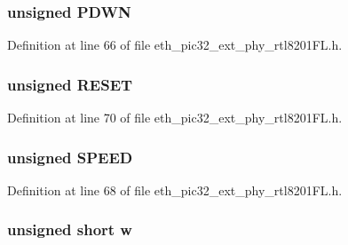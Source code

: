 \subsubsection[{P\+D\+W\+N}]{\setlength{\rightskip}{0pt plus 5cm}unsigned P\+D\+W\+N}\label{union_____b_m_c_o_nbits__t_a1d62ad60d164ae9584ed177c6d49d0c2}


Definition at line 66 of file eth\+\_\+pic32\+\_\+ext\+\_\+phy\+\_\+rtl8201\+F\+L.\+h.

\hypertarget{union_____b_m_c_o_nbits__t_abd544ef72bf6c8e26d48024e20c2ac9b}{}
\subsubsection[{R\+E\+S\+E\+T}]{\setlength{\rightskip}{0pt plus 5cm}unsigned R\+E\+S\+E\+T}\label{union_____b_m_c_o_nbits__t_abd544ef72bf6c8e26d48024e20c2ac9b}


Definition at line 70 of file eth\+\_\+pic32\+\_\+ext\+\_\+phy\+\_\+rtl8201\+F\+L.\+h.

\hypertarget{union_____b_m_c_o_nbits__t_a95fd4dafd860304d6b44d4fb14881daa}{}
\subsubsection[{S\+P\+E\+E\+D}]{\setlength{\rightskip}{0pt plus 5cm}unsigned S\+P\+E\+E\+D}\label{union_____b_m_c_o_nbits__t_a95fd4dafd860304d6b44d4fb14881daa}


Definition at line 68 of file eth\+\_\+pic32\+\_\+ext\+\_\+phy\+\_\+rtl8201\+F\+L.\+h.

\hypertarget{union_____b_m_c_o_nbits__t_a160850a4684a3e82c2323033964f2e98}{}
\subsubsection[{w}]{\setlength{\rightskip}{0pt plus 5cm}unsigned short w}\label{union_____b_m_c_o_nbits__t_a160850a4684a3e82c2323033964f2e98}


